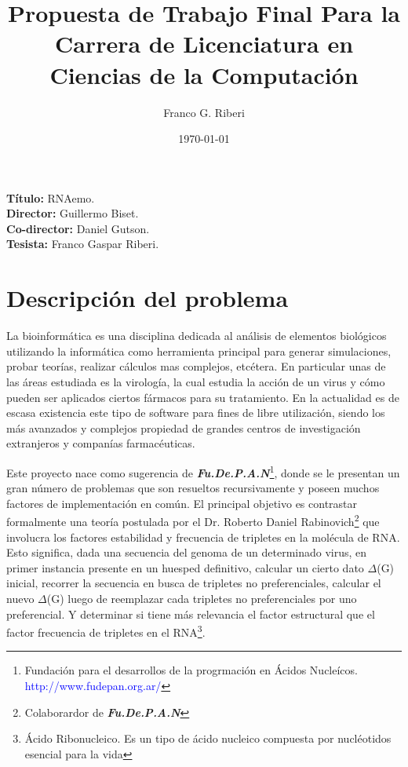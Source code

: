\documentclass[12pt,a4paper]{article}
\begin{document}
 

\title{Propuesta de Trabajo Final Para la Carrera de Licenciatura en Ciencias de la Computación}
		\vskip 2cm
\author{Franco G. Riberi}
		\vskip 2cm
\date{\today} 	

\maketitle

\noindent \textbf{Título:} RNAemo. \\
\vskip 0.01cm
\noindent \textbf{Director:} Guillermo Biset.\\ %
\vskip 0.01cm
\noindent \textbf{Co-director:}  Daniel Gutson.\\
\vskip 0.01cm
\noindent \textbf{Tesista:} Franco Gaspar Riberi. \\


\section{Descripción del problema}

\par La bioinformática es una disciplina dedicada al análisis de elementos biológicos utilizando la
informática como herramienta principal para generar simulaciones, probar teorías,  realizar cálculos mas complejos, etcétera. En particular unas de las áreas estudiada es la virología, la cual estudia la acción de un virus y cómo pueden ser aplicados ciertos fármacos para su tratamiento. En la actualidad es de escasa existencia este tipo de software para fines de libre utilización, siendo los más avanzados y complejos propiedad de grandes centros de investigación extranjeros y companías farmacéuticas. 

\par Este proyecto nace como sugerencia de \textbf{\textit{Fu.De.P.A.N}}\footnote{Fundación para el desarrollos de la progrmación en Ácidos Nucleícos. \textcolor{blue}{http://www.fudepan.org.ar/}}, donde se le presentan un gran número de problemas que son resueltos recursivamente y poseen muchos factores de implementación en común. El principal objetivo es contrastar formalmente una teoría postulada por el Dr. Roberto Daniel Rabinovich\footnote{Colaborardor de \textbf{\textit{Fu.De.P.A.N}}} que involucra los factores estabilidad y frecuencia de tripletes en la molécula de RNA. Esto significa, dada una secuencia del genoma de un determinado virus, en primer instancia presente en un huesped definitivo, calcular un cierto dato $\Delta$(G) inicial, recorrer la secuencia en busca de tripletes no preferenciales, calcular el nuevo
$\Delta$(G) luego de reemplazar cada tripletes no preferenciales por uno preferencial. Y determinar si tiene más relevancia el factor estructural que el factor frecuencia de tripletes en el RNA\footnote{Ácido Ribonucleico. Es un tipo de ácido nucleico compuesta por nucléotidos esencial para la vida}. 
\end{document}
